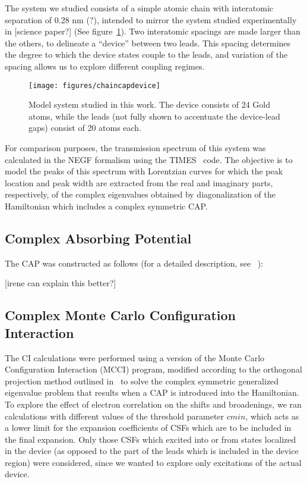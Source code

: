 The system we studied consists of a simple atomic chain with interatomic
separation of 0.28 nm (?), intended to mirror the system studied experimentally
in [science paper?] (See figure~\ref{fig:chaincapdevice}). Two interatomic
spacings are made larger than the others, to delineate a ``device'' between two
leads. This spacing determines the degree to which the device states couple to
the leads, and variation of the spacing allows us to explore different coupling
regimes.

\begin{figure}
	\begin{center}
		\texttt{[image: figures/chaincapdevice]}
	\end{center}
	\caption{Model system studied in this work. The device consists of 24
	Gold atoms, while the leads (not fully shown to accentuate the
	device-lead gaps) consist of 20 atoms each.}
	\label{fig:chaincapdevice}
\end{figure}

For comparison purposes, the transmission spectrum of this system was
calculated in the NEGF formalism using the TIMES~\cite{times} code. The
objective is to model the peaks of this spectrum with Lorentzian curves for
which the peak location and peak width are extracted from the real and
imaginary parts, respectively, of the complex eigenvalues obtained by
diagonalization of the Hamiltonian which includes a complex symmetric CAP.

\subsection{Complex Absorbing Potential}
\label{subsec:CAP}

The CAP was constructed as follows (for a detailed description, see~
\cite{henderson}):

[irene can explain this better?]

\subsection{Complex Monte Carlo Configuration Interaction}

The CI calculations were performed using a version of the Monte Carlo
Configuration Interaction (MCCI) program, modified according to the orthogonal
projection method outlined in~\cite{tarantelli_csd} to solve the complex
symmetric generalized eigenvalue problem that results when a CAP is introduced
into the Hamiltonian. To explore the effect of electron correlation on the
shifts and broadenings, we ran calculations with different values of the
threshold parameter $cmin$, which acts as a lower limit for the expansion
coefficients of CSFs which are to be included in the final expansion. Only
those CSFs which excited into or from states localized in the device (as
opposed to the part of the leads which is included in the device region) were
considered, since we wanted to explore only excitations of the actual device.

